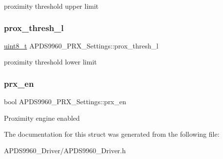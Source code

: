 proximity threshold upper limit \mbox{\label{structAPDS9960__PRX__Settings_a6444eabe6fb90f8530db05303b464070}} 
\subsubsection{\texorpdfstring{prox\+\_\+thresh\+\_\+l}{prox\_thresh\_l}}
{\footnotesize\ttfamily \hyperlink{vl53l0x__types_8h_aba7bc1797add20fe3efdf37ced1182c5}{uint8\+\_\+t} A\+P\+D\+S9960\+\_\+\+P\+R\+X\+\_\+\+Settings\+::prox\+\_\+thresh\+\_\+l}

proximity threshold lower limit \mbox{\label{structAPDS9960__PRX__Settings_af5eaa566c4e9a0acfcea99e9d66ff1ce}} 
\subsubsection{\texorpdfstring{prx\+\_\+en}{prx\_en}}
{\footnotesize\ttfamily bool A\+P\+D\+S9960\+\_\+\+P\+R\+X\+\_\+\+Settings\+::prx\+\_\+en}

Proximity engine enabled 

The documentation for this struct was generated from the following file\+:\begin{DoxyCompactItemize}
\item 
A\+P\+D\+S9960\+\_\+\+Driver/A\+P\+D\+S9960\+\_\+\+Driver.\+h\end{DoxyCompactItemize}

